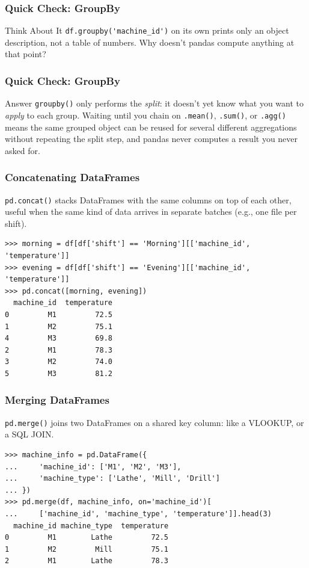 \begin{frame}[fragile]\frametitle{Quick Check: GroupBy}
\begin{block}{Think About It}
\lstinline{df.groupby('machine_id')} on its own prints only an object description, not a table
of numbers. Why doesn't pandas compute anything at that point?
\end{block}
\end{frame}

\begin{frame}[fragile]\frametitle{Quick Check: GroupBy}
\begin{block}{Answer}
\lstinline{groupby()} only performs the \emph{split}: it doesn't yet know what you want to
\emph{apply} to each group. Waiting until you chain on \lstinline{.mean()}, \lstinline{.sum()},
or \lstinline{.agg()} means the same grouped object can be reused for several different
aggregations without repeating the split step, and pandas never computes a result you never
asked for.
\end{block}
\end{frame}

\begin{frame}[fragile]\frametitle{Concatenating DataFrames}
\texttt{pd.concat()} stacks DataFrames with the same columns on top of each other, useful when the same kind of data arrives in separate batches (e.g., one file per shift).
\begin{lstlisting}
>>> morning = df[df['shift'] == 'Morning'][['machine_id', 'temperature']]
>>> evening = df[df['shift'] == 'Evening'][['machine_id', 'temperature']]
>>> pd.concat([morning, evening])
  machine_id  temperature
0         M1         72.5
1         M2         75.1
4         M3         69.8
2         M1         78.3
3         M2         74.0
5         M3         81.2
\end{lstlisting}
\end{frame}

\begin{frame}[fragile]\frametitle{Merging DataFrames}
\texttt{pd.merge()} joins two DataFrames on a shared key column: like a VLOOKUP, or a SQL JOIN.
\begin{lstlisting}
>>> machine_info = pd.DataFrame({
...     'machine_id': ['M1', 'M2', 'M3'],
...     'machine_type': ['Lathe', 'Mill', 'Drill']
... })
>>> pd.merge(df, machine_info, on='machine_id')[
...     ['machine_id', 'machine_type', 'temperature']].head(3)
  machine_id machine_type  temperature
0         M1        Lathe         72.5
1         M2         Mill         75.1
2         M1        Lathe         78.3
\end{lstlisting}
\end{frame}

